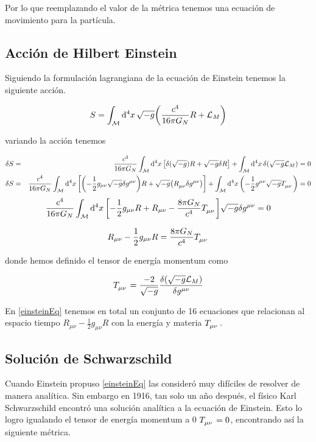 \documentclass[../Main.tex]{subfiles}
\begin{document}
Por lo que reemplazando el valor de la métrica tenemos una ecuación de movimiento para la partícula.

\subsection{Acción de Hilbert Einstein}
Siguiendo la formulación lagrangiana de la ecuación de Einstein tenemos la siguiente acción.

\begin{equation}
    S = \int_{\mathcal{M}}\dd[4]{x}\sqrt{-g}\qty(\dfrac{c^{4}}{16\pi G_{N}}R+\mathcal{L}_{M})
\end{equation}

variando la acción tenemos

\begin{eqnarray*}
    \delta S = && \dfrac{c^{4}}{16\pi G_{N}} \int_{\mathcal{M}}\dd[4]{x}\qty[\delta(\sqrt{-g})R+\sqrt{-g}\delta R]+\int_{\mathcal{M}}\dd[4]{x}\delta(\sqrt{-g}\mathcal{L}_{M}) = 0 \\
    \delta S = && \dfrac{c^{4}}{16\pi G_{N}} \int_{\mathcal{M}}\dd[4]{x}\qty[\qty(-\frac{1}{2}g_{\mu\nu}\sqrt{-g}\delta g^{\mu\nu})R + \sqrt{-g}\qty(\tensor{R}{_{\mu\nu}}\delta g^{\mu\nu})]+\int_{\mathcal{M}}\dd[4]{x}\qty(-\frac{1}{2}g^{\mu\nu}\sqrt{-g}\tensor{T}{_{\mu\nu}})= 0
\end{eqnarray*}
\begin{equation}
    \dfrac{c^{4}}{16\pi G_{N}} \int_{\mathcal{M}}\dd[4]{x}\qty[-\frac{1}{2}g_{\mu\nu}R+R_{\mu\nu}-\frac{8\pi G_{N}}{c^{4}}\tensor{T}{_{\mu\nu}}]\sqrt{-g}\delta g^{\mu\nu} = 0
\end{equation}

\begin{equation}
    R_{\mu\nu} - \frac{1}{2}g_{\mu\nu}R = \frac{8\pi G_{N}}{c^{4}}\tensor{T}{_{\mu\nu}}
    \label{einsteinEq}
\end{equation}

donde hemos definido el tensor de energía momentum como

\begin{equation}
    \tensor{T}{_{\mu\nu}} = \dfrac{-2}{\sqrt{-g}}\fdv{(\sqrt{-g}\mathcal{L}_{M})}{g^{\mu\nu}}
\end{equation}

En \eqref{einsteinEq} tenemos en total un conjunto de 16 ecuaciones que relacionan al espacio tiempo $R_{\mu\nu} - \frac{1}{2}g_{\mu\nu}R$ con la energía y materia $\tensor{T}{_{\mu\nu}}$.

\subsection{Solución de Schwarzschild}
Cuando Einstein propuso \eqref{einsteinEq} las consideró muy difíciles de resolver de manera analítica. Sin embargo en 1916, tan solo un año después, el físico Karl Schwarzschild encontró una solución analítica a la ecuación de Einstein. Esto lo logro igualando el tensor de energía momentum a 0 $\tensor{T}{_{\mu\nu}}=0$, encontrando así la siguiente métrica.
\end{document}
